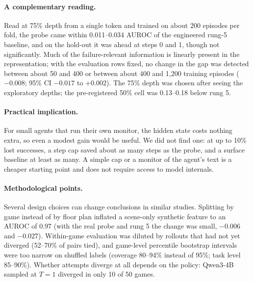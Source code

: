\documentclass[10pt]{article}
\begin{document}
\paragraph{A complementary reading.} Read at 75\% depth from a single token and trained on about 200 episodes per fold, the probe came within 0.011--0.034 AUROC of the engineered rung-5 baseline, and on the hold-out it was ahead at steps 0 and 1, though not significantly. Much of the failure-relevant information is linearly present in the representation; with the evaluation rows fixed, no change in the gap was detected between about 50 and 400 or between about 400 and 1,200 training episodes ($-0.008$; 95\% CI $-0.017$ to $+0.002$). The 75\% depth was chosen after seeing the exploratory depths; the pre-registered 50\% cell was 0.13--0.18 below rung 5.

\paragraph{Practical implication.} For small agents that run their own monitor, the hidden state costs nothing extra, so even a modest gain would be useful. We did not find one: at up to 10\% lost successes, a step cap saved about as many steps as the probe, and a surface baseline at least as many.
A simple cap or a monitor of the agent's text is a cheaper starting point and does not require access to model internals.

\paragraph{Methodological points.} Several design choices can change conclusions in similar studies. Splitting by game instead of by floor plan inflated a scene-only synthetic feature to an AUROC of 0.97 (with the real probe and rung 5 the change was small, $-0.006$ and $-0.027$).
Within-game evaluation was diluted by rollouts that had not yet diverged (52--70\% of pairs tied), and game-level percentile bootstrap intervals were too narrow on shuffled labels (coverage 80--94\% instead of 95\%; task level 85--90\%).
Whether attempts diverge at all depends on the policy: Qwen3-4B sampled at $T = 1$ diverged in only 10 of 50 games.
\end{document}
